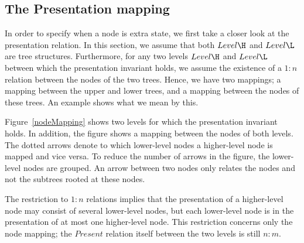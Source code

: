 







%																
\subsection{The Presentation mapping}\label{mappingsInLayer}


In order to specify when a node is extra state, we first take a closer look at the presentation relation. In this section, we assume that both $Level\H$ and $Level\L$ are tree structures. Furthermore, for any two levels $Level\H$ and $Level\L$ between which the presentation invariant holds, we assume the existence of a $1:n$ relation between the nodes of the two trees. Hence, we have two mappings; a mapping between the upper and lower trees, and a mapping between the nodes of these trees. An example shows what we mean by this.

Figure~\ref{nodeMapping} shows two levels for which the presentation invariant holds. In addition, the figure shows a mapping between the nodes of both levels. The dotted arrows denote to which lower-level nodes a higher-level node is mapped and vice versa. To reduce the number of arrows in the figure, the lower-level nodes are grouped. An arrow between two nodes only relates the nodes and not the subtrees rooted at these nodes. %

The restriction to $1:n$ relations implies that the presentation of a higher-level node may consist of several lower-level nodes, but each lower-level node is in the presentation of at most one higher-level node. This restriction concerns only the node mapping; the $Present$ relation itself between the two levels is still $n:m$. 

